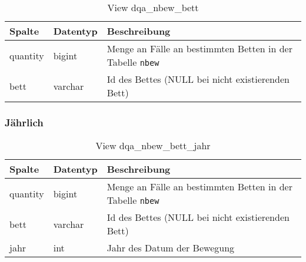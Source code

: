 \begin{table}[ht]
	\centering   
	\caption{View dqa\_nbew\_bett}
	\label{tab:beweBettAll}
	\begin{tabular}{||l|l|p{10cm}||}   		
		\hline
		Spalte & Datentyp & Beschreibung \\ [0.5ex]
		\hline\hline
		quantity & bigint & Menge an Fälle an bestimmten Betten in der Tabelle \texttt{nbew} \\
		\hline
		bett & varchar & Id des Bettes (NULL bei nicht existierenden Bett)\\
		\hline
		
	\end{tabular}
\end{table}

\subsubsection{Jährlich} \label{subsubsec:bettJ}

\begin{table}[ht]
	\centering   
	\caption{View dqa\_nbew\_bett\_jahr}
	\label{tab:beweBettJahr}
	\begin{tabular}{||l|l|p{10cm}||}   		
		\hline
		Spalte & Datentyp & Beschreibung \\ [0.5ex]
		\hline\hline
		quantity & bigint & Menge an Fälle an bestimmten Betten in der Tabelle \texttt{nbew} \\
		\hline
		bett & varchar &  Id des Bettes (NULL bei nicht existierenden Bett) \\
		\hline
		jahr & int &  Jahr des Datum der Bewegung \\
		\hline
		
	\end{tabular}
\end{table}


